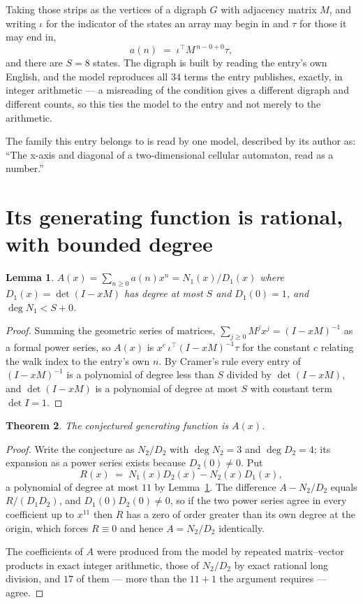 \documentclass[11pt,a4paper]{article}
\theoremstyle{plain}
\newtheorem{theorem}{Theorem}
\newtheorem{lemma}[theorem]{Lemma}
\theoremstyle{definition}
\begin{document}
Taking those strips as the vertices of a digraph $G$ with adjacency matrix $M$, and writing
$\iota$ for the indicator of the states an array may begin in and $\tau$ for those it may end
in,
\[
a(n)\;=\;\iota^{\!\top}M^{\,n-0+0}\tau ,
\]
and there are $S=8$ states. The digraph is built by reading the entry's own English, and the
model reproduces all $34$ terms the entry publishes, exactly, in integer arithmetic --- a
misreading of the condition gives a different digraph and different counts, so this ties the
model to the entry and not merely to the arithmetic.

The family this entry belongs to is read by one model, described by its author as: ``The x-axis and diagonal of a two-dimensional cellular automaton, read as a number.''


\section{Its generating function is rational, with bounded degree}

\begin{lemma}\label{lem:rat}
$A(x)=\sum_{n\ge0}a(n)x^n=N_1(x)/D_1(x)$ where $D_1(x)=\det(I-xM)$ has degree at most
$S$ and $D_1(0)=1$, and $\deg N_1<S+0$.
\end{lemma}

\begin{proof}
Summing the geometric series of matrices, $\sum_{j\ge0}M^jx^j=(I-xM)^{-1}$ as a formal
power series, so $A(x)$ is $x^{c}\,\iota^{\!\top}(I-xM)^{-1}\tau$ for the constant $c$
relating the walk index to the entry's own $n$. By Cramer's rule every entry of
$(I-xM)^{-1}$ is a polynomial of degree less than $S$ divided by $\det(I-xM)$, and
$\det(I-xM)$ is a polynomial of degree at most $S$ with constant term $\det I=1$.
\end{proof}

\begin{theorem}
The conjectured generating function is $A(x)$.
\end{theorem}

\begin{proof}
Write the conjecture as $N_2/D_2$ with $\deg N_2=3$ and $\deg D_2=4$; its expansion as a
power series exists because $D_2(0)\neq0$. Put
\[
R(x)\;=\;N_1(x)D_2(x)-N_2(x)D_1(x),
\]
a polynomial of degree at most $11$ by Lemma~\ref{lem:rat}. The difference
$A-N_2/D_2$ equals $R/(D_1D_2)$, and $D_1(0)D_2(0)\neq0$, so if the two power series agree in
every coefficient up to $x^{11}$ then $R$ has a zero of order greater than its own
degree at the origin, which forces $R\equiv0$ and hence $A=N_2/D_2$ identically.

The coefficients of $A$ were produced from the model by repeated matrix--vector products in
exact integer arithmetic, those of $N_2/D_2$ by exact rational long division, and $17$
of them --- more than the $11+1$ the argument requires --- agree.
\end{proof}
\end{document}
